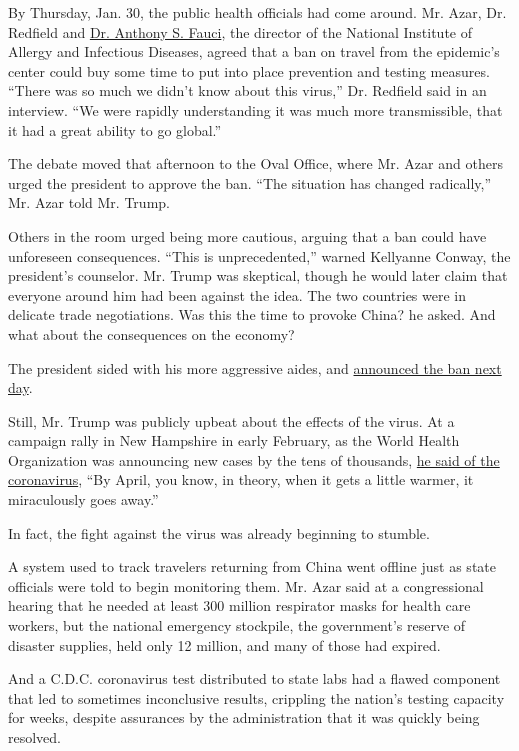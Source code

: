 By Thursday, Jan. 30, the public health officials had come around. Mr.
Azar, Dr. Redfield and
\href{https://www.nytimes3xbfgragh.onion/2020/03/11/us/politics/anthony-fauci-coronavirus.html}{Dr.
Anthony S. Fauci}, the director of the National Institute of Allergy and
Infectious Diseases, agreed that a ban on travel from the epidemic's
center could buy some time to put into place prevention and testing
measures. ``There was so much we didn't know about this virus,'' Dr.
Redfield said in an interview. ``We were rapidly understanding it was
much more transmissible, that it had a great ability to go global.''

The debate moved that afternoon to the Oval Office, where Mr. Azar and
others urged the president to approve the ban. ``The situation has
changed radically,'' Mr. Azar told Mr. Trump.

Others in the room urged being more cautious, arguing that a ban could
have unforeseen consequences. ``This is unprecedented,'' warned
Kellyanne Conway, the president's counselor. Mr. Trump was skeptical,
though he would later claim that everyone around him had been against
the idea. The two countries were in delicate trade negotiations. Was
this the time to provoke China? he asked. And what about the
consequences on the economy?

The president sided with his more aggressive aides, and
\href{https://www.nytimes3xbfgragh.onion/2020/01/31/business/china-travel-coronavirus.html}{announced
the ban next day}.

Still, Mr. Trump was publicly upbeat about the effects of the virus. At
a campaign rally in New Hampshire in early February, as the World Health
Organization was announcing new cases by the tens of thousands,
\href{https://www.cnn.com/2020/02/11/politics/trump-new-hampshire-rally/index.html}{he
said of the coronavirus}, ``By April, you know, in theory, when it gets
a little warmer, it miraculously goes away.''

In fact, the fight against the virus was already beginning to stumble.

A system used to track travelers returning from China went offline just
as state officials were told to begin monitoring them. Mr. Azar said at
a congressional hearing that he needed at least 300 million respirator
masks for health care workers, but the national emergency stockpile, the
government's reserve of disaster supplies, held only 12 million, and
many of those had expired.

And a C.D.C. coronavirus test distributed to state labs had a flawed
component that led to sometimes inconclusive results, crippling the
nation's testing capacity for weeks, despite assurances by the
administration that it was quickly being resolved.

